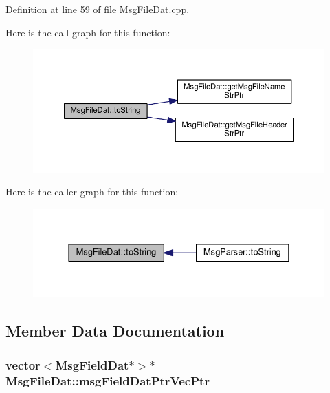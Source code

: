 Definition at line 59 of file Msg\-File\-Dat.\-cpp.



Here is the call graph for this function\-:
\nopagebreak
\begin{figure}[H]
\begin{center}
\leavevmode
\includegraphics[width=350pt]{class_msg_file_dat_a077a61b03ad790bcd9b44f814f547502_cgraph}
\end{center}
\end{figure}




Here is the caller graph for this function\-:
\nopagebreak
\begin{figure}[H]
\begin{center}
\leavevmode
\includegraphics[width=328pt]{class_msg_file_dat_a077a61b03ad790bcd9b44f814f547502_icgraph}
\end{center}
\end{figure}




\subsection{Member Data Documentation}
\hypertarget{class_msg_file_dat_ab2dbc7dcb9a7c27db1384a3f2a816acd}{
\subsubsection[{msg\-Field\-Dat\-Ptr\-Vec\-Ptr}]{\setlength{\rightskip}{0pt plus 5cm}vector$<${\bf Msg\-Field\-Dat}$\ast$$>$$\ast$ Msg\-File\-Dat\-::msg\-Field\-Dat\-Ptr\-Vec\-Ptr\hspace{0.3cm}{\ttfamily [private]}}}\label{class_msg_file_dat_ab2dbc7dcb9a7c27db1384a3f2a816acd}


